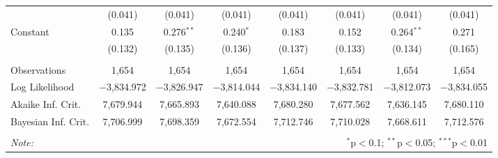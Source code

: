 \begin{sidewaystable}[!htbp]
\begin{tabular}{@{\extracolsep{5pt}}lccccccc}
  & (0.041) & (0.041) & (0.041) & (0.041) & (0.041) & (0.041) & (0.041) \\ 
  Constant & 0.135 & 0.276$^{**}$ & 0.240$^{*}$ & 0.183 & 0.152 & 0.264$^{**}$ & 0.271 \\ 
  & (0.132) & (0.135) & (0.136) & (0.137) & (0.133) & (0.134) & (0.165) \\ 
 \hline \\[-1.8ex] 
Observations & 1,654 & 1,654 & 1,654 & 1,654 & 1,654 & 1,654 & 1,654 \\ 
Log Likelihood & $-$3,834.972 & $-$3,826.947 & $-$3,814.044 & $-$3,834.140 & $-$3,832.781 & $-$3,812.073 & $-$3,834.055 \\ 
Akaike Inf. Crit. & 7,679.944 & 7,665.893 & 7,640.088 & 7,680.280 & 7,677.562 & 7,636.145 & 7,680.110 \\ 
Bayesian Inf. Crit. & 7,706.999 & 7,698.359 & 7,672.554 & 7,712.746 & 7,710.028 & 7,668.611 & 7,712.576 \\ 
\hline 
\hline \\[-1.8ex] 
\textit{Note:}  & \multicolumn{7}{r}{$^{*}$p$<$0.1; $^{**}$p$<$0.05; $^{***}$p$<$0.01} \\ 
\end{tabular} 
\end{sidewaystable} 
